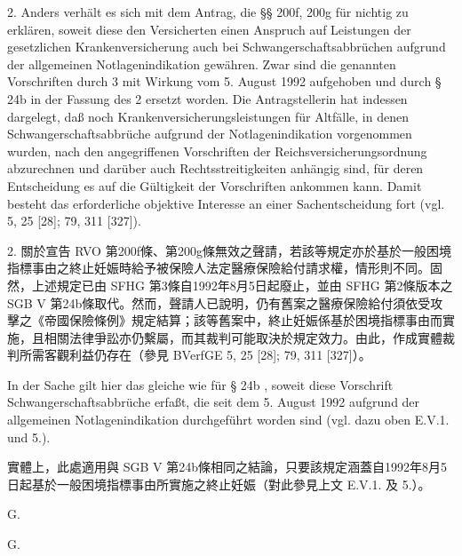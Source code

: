 \documentclass[12pt]{article}
\begin{document}
\begin{sourcepara}[title={原文E.262}]
2. Anders verhält es sich mit dem Antrag, die §§ 200f, 200g \abbrRVO{} für nichtig zu erklären, soweit diese den Versicherten einen Anspruch auf Leistungen der gesetzlichen Krankenversicherung auch bei Schwangerschaftsabbrüchen aufgrund der allgemeinen Notlagenindikation gewähren. Zwar sind die genannten Vorschriften durch \abbrArt{} 3 \abbrSFHG{} mit Wirkung vom 5. August 1992 aufgehoben und durch § 24b \abbrSGBV{} in der Fassung des \abbrArt{} 2 \abbrSFHG{} ersetzt worden. Die Antragstellerin hat indessen dargelegt, daß noch Krankenversicherungsleistungen für Altfälle, in denen Schwangerschaftsabbrüche aufgrund der Notlagenindikation vorgenommen wurden, nach den angegriffenen Vorschriften der Reichsversicherungsordnung abzurechnen und darüber auch Rechtsstreitigkeiten anhängig sind, für deren Entscheidung es auf die Gültigkeit der Vorschriften ankommen kann. Damit besteht das erforderliche objektive Interesse an einer Sachentscheidung fort (vgl. \abbrBVerfGE{} 5, 25 [28]; 79, 311 [327]).
\end{sourcepara}
\begin{transpara}
2. 關於宣告 RVO 第200f條、第200g條無效之聲請，若該等規定亦於基於一般困境指標事由之終止妊娠時給予被保險人法定醫療保險給付請求權，情形則不同。固然，上述規定已由 SFHG 第3條自1992年8月5日起廢止，並由 SFHG 第2條版本之 SGB V 第24b條取代。然而，聲請人已說明，仍有舊案之醫療保險給付須依受攻擊之《帝國保險條例》規定結算；該等舊案中，終止妊娠係基於困境指標事由而實施，且相關法律爭訟亦仍繫屬，而其裁判可能取決於規定效力。由此，作成實體裁判所需客觀利益仍存在（參見 BVerfGE 5, 25 [28]; 79, 311 [327]）。
\end{transpara}

\begin{sourcepara}[title={原文E.263}]
In der Sache gilt hier das gleiche wie für § 24b \abbrSGBV{}, soweit diese Vorschrift Schwangerschaftsabbrüche erfaßt, die seit dem 5. August 1992 aufgrund der allgemeinen Notlagenindikation durchgeführt worden sind (vgl. dazu oben E.V.1. und 5.).
\end{sourcepara}
\begin{transpara}
實體上，此處適用與 SGB V 第24b條相同之結論，只要該規定涵蓋自1992年8月5日起基於一般困境指標事由所實施之終止妊娠（對此參見上文 E.V.1. 及 5.）。
\end{transpara}

\bikeepwithnext[6]
\begin{sourcepara}[title={原文E.264}]
G.
\end{sourcepara}
\begin{transpara}
G.
\end{transpara}
\end{document}
